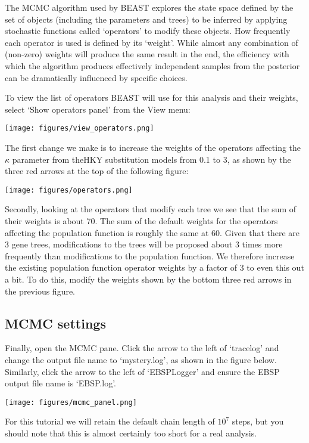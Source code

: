 \documentclass[a4paper,11pt]{article}
\begin{document}
The MCMC algorithm used by BEAST explores the state space defined by the set of
objects (including the parameters and trees) to be inferred by applying
stochastic functions called `operators' to modify these objects. How frequently
each operator is used is defined by its `weight'. While almost any combination of (non-zero) weights will produce the same result in the end, the efficiency with which the algorithm produces effectively independent samples from the posterior can be dramatically influenced by specific choices.

To view the list of operators BEAST will use for this analysis and their
weights, select `Show operators panel' from the View menu:

\texttt{[image: figures/view\_operators.png]}

The first change we make is to increase the weights of the operators affecting
the $\kappa$ parameter from theHKY substitution models from 0.1 to 3, as shown
by the three red arrows at the top of the following figure:

\texttt{[image: figures/operators.png]}

Secondly, looking at the operators that modify each tree we see that the sum of
their weights is about 70. The sum of the default weights for the operators
affecting the population function is roughly the same at 60. Given that there
are 3 gene trees, modifications to the trees will be proposed about 3 times
more frequently than modifications to the population function.  We therefore
increase the existing population function operator weights by a factor of 3 to
even this out a bit.  To do this, modify the weights shown by the bottom three
red arrows in the previous figure.

\subsection{MCMC settings}

Finally, open the \textsc{MCMC} pane. Click the arrow to the left of `tracelog'
and change the output file name to `mystery.log', as shown in the figure below.
Similarly, click the arrow to the left of `EBSPLogger' and ensure the EBSP
output file name is `EBSP.log'.

    \texttt{[image: figures/mcmc\_panel.png]}

For this tutorial we will retain the default chain length of $10^7$ steps, but
you should note that this is almost certainly too short for a real analysis.
\end{document}
